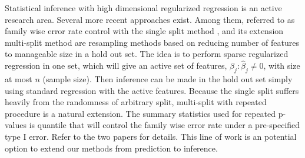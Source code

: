 Statistical inference with high dimensional regularized regression is an active research area. Several more recent approaches exist. Among them, referred to as family wise error rate control with the single split method \citep{wasserman2009high}, and its extension multi-split method \citep{meinshausen2009p} are resampling methods based on reducing number of features to manageable size in a hold out set. The idea is to perform sparse regularized regression in one set, which will give an active set of features, $\beta_j:\hat{\beta}_j\neq 0$, with size at most $n$ (sample size). Then inference can be made in the hold out set simply using standard regression with the active features. Because the single split suffers heavily from the randomness of arbitrary split, multi-split with repeated procedure is a natural extension. The summary statistics used for repeated p-values is quantile that will control the family wise error rate under a pre-specified type I error. Refer to the two papers for details. This line of work is an potential option to extend our methods from prediction to inference.      
